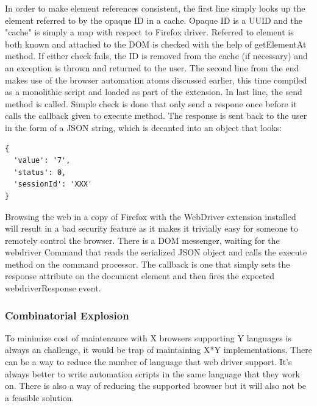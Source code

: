 \documentclass[article,type=msc,colorback,accentcolor=tud9c,twoside,11pt]{tudthesis}
\begin{document}
In order to make element references consistent, the first line simply looks up the element referred to by the opaque ID in a cache. Opaque ID is a UUID and the "cache" is simply a map with respect to Firefox driver. Referred to element is both known and attached to the DOM is checked with the help of getElementAt method. If either check fails, the ID is removed from the cache (if necessary) and an exception is thrown and returned to the user.
The second line from the end makes use of the browser automation atoms discussed earlier, this time compiled as a monolithic script and loaded as part of the extension.
In last line, the send method is called. Simple check is done that only send a respone once before it calls the callback given to execute method. The response is sent back to the user in the form of a JSON string, which is decanted into an object that looks:
\begin{lstlisting}
{
  'value': '7',
  'status': 0,
  'sessionId': 'XXX'
}
\end{lstlisting}
Browsing the web in a copy of Firefox with the WebDriver extension installed will result in a bad security feature as it makes it trivially easy for someone to remotely control the browser.
There is a DOM messenger, waiting for the webdriver Command that reads the serialized JSON object and calls the execute method on the command processor. The callback is one that simply sets the response attribute on the document element and then fires the expected webdriverResponse event.

\subsubsection{Combinatorial Explosion}
To minimize cost of maintenance with X browsers supporting Y languages is always an challenge, it would be trap of maintaining X*Y implementations. There can be a way to reduce the number of language that web driver support. It's always better to write automation scripts in the same language that they work on. There is also a way of reducing the supported browser but it will also not be a feasible solution.
\end{document}
